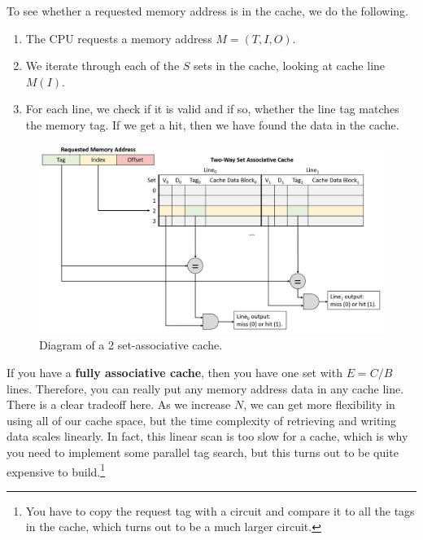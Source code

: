     \begin{theorem}[Lookup]
      To see whether a requested memory address is in the cache, we do the following. 
      \begin{enumerate}
        \item The CPU requests a memory address $M = (T, I, O)$. 
        \item We iterate through each of the $S$ sets in the cache, looking at cache line $M(I)$. 
        \item For each line, we check if it is valid and if so, whether the line tag matches the memory tag. If we get a hit, then we have found the data in the cache. 
      \end{enumerate}

      \begin{figure}[H]
        \centering 
        \includegraphics[scale=0.4]{img/retrieve_set_associative.png}
        \caption{Diagram of a 2 set-associative cache.} 
        \label{fig:retrieve_set_associative}
      \end{figure}
    \end{theorem}

    If you have a \textbf{fully associative cache}, then you have one set with $E = C/B$ lines. Therefore, you can really put any memory address data in any cache line. There is a clear tradeoff here. As we increase $N$, we can get more flexibility in using all of our cache space, but the time complexity of retrieving and writing data scales linearly. In fact, this linear scan is too slow for a cache, which is why you need to implement some parallel tag search, but this turns out to be quite expensive to build.\footnote{You have to copy the request tag with a circuit and compare it to all the tags in the cache, which turns out to be a much larger circuit.}
  
